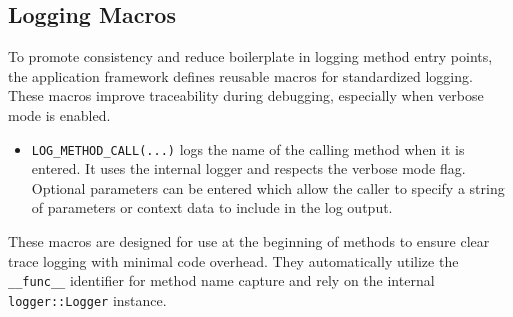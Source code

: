 \subsection*{Logging Macros}
To promote consistency and reduce boilerplate in logging method entry points, the application framework defines reusable macros for standardized logging. These macros improve traceability during debugging, especially when verbose mode is enabled.
\begin{itemize}
    \item \texttt{LOG\_METHOD\_CALL(...)} logs the name of the calling method when it is entered. It uses the internal logger and respects the verbose mode flag. Optional parameters can be entered which allow the caller to specify a string of parameters or context data to include in the log output.
\end{itemize}
These macros are designed for use at the beginning of methods to ensure clear trace logging with minimal code overhead. They automatically utilize the \texttt{\_\_func\_\_} identifier for method name capture and rely on the internal \texttt{logger::Logger} instance.



